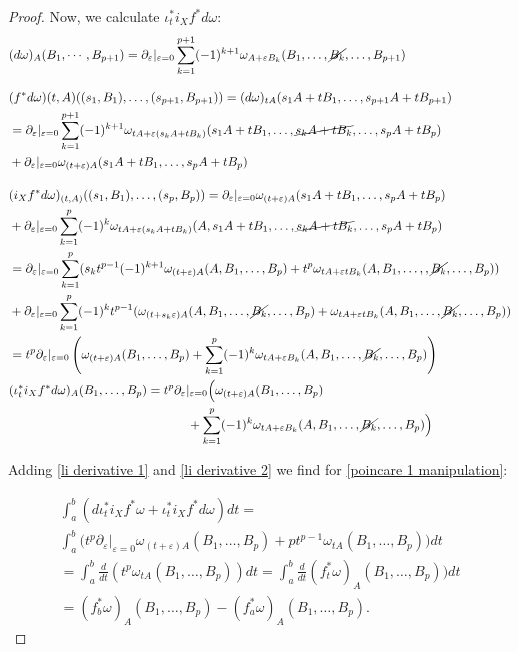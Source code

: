 \documentclass[a4paper,11pt]{article}
\begin{document}
\begin{proof}
Now, we calculate \(\iota^*_t i_X f^* d \omega\):
\begin{align}
&(d\omega)_A(B_1,\cdots, B_{p+1})=\partial_\varepsilon |_{\varepsilon=0} \sum_{k=1}^{p+1} (-1)^{k+1} \omega_{A+\varepsilon B_k}(B_1,\dots , \cancel{B_k}, \dots, B_{p+1})\\[0.3cm]
&(f^* d \omega){(t,A)}((s_1,B_1),\dots , (s_{p+1},B_{p+1}))= (d\omega)_{tA}(s_1A + t B_1, \dots, s_{p+1}A+t B_{p+1})\\
&=\partial_{\varepsilon}|_{\varepsilon =0} \sum_{k=1}^{p+1}(-1)^{k+1} \omega_{tA + \varepsilon(s_kA + t B_k)}(s_1A+tB_1, \dots,  \cancel{s_k A + t B_k},\dots , s_p A  + t B_p )\\
&+ \partial_{\varepsilon}|_{\varepsilon =0} \omega_{(t+\varepsilon)A}(s_1 A + t B_{1},\dots, s_p A + t B_p)\\[0.4cm]
&(i_X f^* d \omega)_{(t,A)}((s_1,B_1),\dots , (s_p, B_p))= \partial_{\varepsilon} |_{\varepsilon =0} \omega_{(t+\varepsilon)A}(s_1A+tB_1, \dots, s_pA+t B_p)\\
&+\partial_{\varepsilon}|_{\varepsilon=0} \sum_{k=1}^p (-1)^k \omega_{tA + \varepsilon(s_k A + t B_k)} (A,s_1A+t B_1, \dots, \cancel{s_k A + t B_k},\dots, s_p A + t B_p)\\
&=\partial_{\varepsilon}|_{\varepsilon=0} \sum_{k=1}^p(s_k t^{p-1} (-1)^{k+1} \omega_{(t+\varepsilon)A}(A,B_1,\dots, B_p) + t^p \omega_{tA + \varepsilon t B_k}(A,B_1,\dots, ,\cancel{B_k},\dots, B_p))\\
&+\partial_{\varepsilon}|_{\varepsilon=0}\sum_{k=1}^p(-1)^k t^{p-1}(\omega_{(t+s_k\varepsilon)A}(A,B_1,\dots, \cancel{B_k},\dots, B_p) + \omega_{tA + \varepsilon t B_k}(A,B_1, \dots, \cancel{B_k},\dots, B_p))\\
&=t^p\partial_{\varepsilon}|_{\varepsilon=0} \left(\omega_{(t+\varepsilon)A}(B_1,\dots, B_p) +\sum_{k=1}^p (-1)^k \omega_{tA+\varepsilon B_k}(A,B_1,\dots, \cancel{B_k},\dots, B_p)\right)\\
&(\iota_t^* i_X f^* d \omega)_{A}(B_1,\dots ,  B_p)=t^p\partial_{\varepsilon}|_{\varepsilon=0} \Big(\omega_{(t+\varepsilon)A}(B_1,\dots, B_p)\\\label{li derivative 2}
&\hspace{5cm}+\sum_{k=1}^p (-1)^k \omega_{tA+\varepsilon B_k}(A,B_1,\dots, \cancel{B_k},\dots, B_p)\Big)
\end{align}

Adding \eqref{li derivative 1} and \eqref{li derivative 2} we find for \eqref{poincare 1 manipulation}:

\begin{align}
\int_a^b (d\iota_t^* i_X f^* \omega+ \iota_t^* i_X f^* d \omega )dt=\\
\int_a^b  \Big( t^p\partial_{\varepsilon}|_{\varepsilon=0} \omega_{(t+\varepsilon)A}(B_1,\dots, B_p)
+p t^{p-1}\omega_{tA}(B_1,\dots, B_p)\Big) dt\\
=\int_a^b  \frac{d}{dt} (t^p \omega_{tA}(B_1,\dots, B_p))dt =\int_a^b  \frac{d}{dt} (f^*_t \omega)_{A}(B_1,\dots, B_p))dt\\
=(f^*_b\omega)_A(B_1,\dots,B_p)-(f^*_a\omega)_A(B_1,\dots,B_p).
\end{align}

\end{proof}
\end{document}
